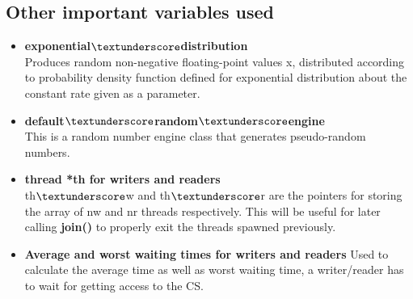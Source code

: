 \documentclass[12pt]{article}
\begin{document}
\subsection{Other important variables used}
\begin{itemize}
\item \textbf{exponential$\textunderscore$distribution}\\
Produces random non-negative floating-point values x, distributed according to probability density function defined for exponential distribution about the constant rate given as a parameter.
\item \textbf{default$\textunderscore$random$\textunderscore$engine}\\
This is a random number engine class that generates pseudo-random numbers.
\item \textbf{thread *th for writers and readers}\\
th$\textunderscore$w and th$\textunderscore$r are the pointers for storing the array of nw and nr threads respectively. This will be useful for later calling \textbf{join()} to properly exit the threads spawned previously.
\item \textbf{Average and worst waiting times for writers and readers}
Used to calculate the average time as well as worst waiting time, a writer/reader has to wait for getting access to the CS.\\
\end{itemize}
\end{document}
